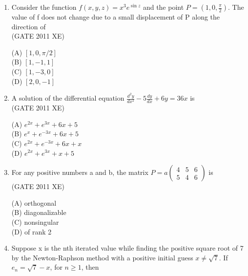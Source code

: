 \documentclass[journal,12pt,onecolumn]{IEEEtran}
\newcommand{\myvec}[1]{\begin{pmatrix}#1\end{pmatrix}}
\begin{document}
\begin{enumerate}[label=\textbf{Q\arabic*.},itemsep=2em]
\hfill{(GATE 2011 XE)} \\
\begin{multicols}{4}
(A) $2\pi i$ \\
(B) $20\pi i$ \\
(C) $13\pi i$ \\
(D) 0
\end{multicols}

\item Consider the function $f(x,y,z) = x^3 e^{\sin z}$ and the point $P = (1,0, \frac{\pi}{2})$. The value of f does not change due to a small displacement of P along the direction of \\

\hfill{(GATE 2011 XE)} \\
\begin{multicols}{4}
(A) $[1,0,\pi/2]$ \\
(B) $[1,-1,1]$ \\
(C) $[1,-3,0]$ \\
(D) $[2,0,-1]$
\end{multicols}

\newpage

\item A solution of the differential equation $\frac{d^2 y}{dx^2} - 5 \frac{dy}{dx} + 6y = 36x$ is \\

\hfill{(GATE 2011 XE)} \\
\begin{multicols}{4}
(A) $e^{2x} + e^{3x} + 6x + 5$ \\
(B) $e^x + e^{-3x} + 6x + 5$ \\
(C) $e^{2x} + e^{-3x} + 6x + x$ \\
(D) $e^{2x} + e^{3x} + x + 5$
\end{multicols}

\item For any positive numbers a and b, the matrix 
$P = a\myvec{4 & 5 & 6 \\ 5 & 4 & 6}$ is \\

\hfill{(GATE 2011 XE)} \\
\begin{multicols}{4}
(A) orthogonal \\
(B) diagonalizable \\
(C) nonsingular \\
(D) of rank 2
\end{multicols}

\item Suppose x is the nth iterated value while finding the positive square root of 7 by the Newton-Raphson method with a positive initial guess $x \neq \sqrt{7}$. If $e_n = \sqrt{7} - x$, for $n \geq 1$, then \\


\end{enumerate}
\end{document}
